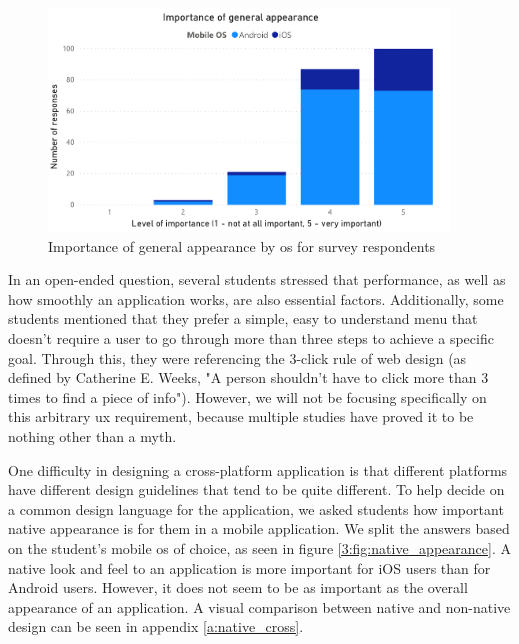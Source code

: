 \begin{figure}[ht]
    \centering
         \includegraphics[width=0.95\textwidth]{figures/charts/survey/appearance.pdf}
    \caption{Importance of general appearance by \acrshort{os} for survey respondents}
    \label{3:fig:appearance}
\end{figure}

In an open-ended question, several students stressed that performance, as well as how smoothly an application works, are also essential factors. Additionally, some students mentioned that they prefer a simple, easy to understand menu that doesn't require a user to go through more than three steps to achieve a specific goal. Through this, they were referencing the 3-click rule of web design (as defined by Catherine E. Weeks\cite{weeks1997design}, "A person shouldn't have to click more than 3 times to find a piece of info"). However, we will not be focusing specifically on this arbitrary \acrshort{ux} requirement, because multiple studies\cite{porter2003testing}\cite{nielsen2006prioritizing} have proved it to be nothing other than a myth.

One difficulty in designing a cross-platform application is that different platforms have different design guidelines that tend to be quite different\cite{thirumala2017interaction}. To help decide on a common design language for the application, we asked students how important native appearance is for them in a mobile application. We split the answers based on the student's mobile \acrshort{os} of choice, as seen in figure \ref{3:fig:native_appearance}. A native look and feel to an application is more important for iOS users than for Android users. However, it does not seem to be as important as the overall appearance of an application. A visual comparison between native and non-native design can be seen in appendix \ref{a:native_cross}.

